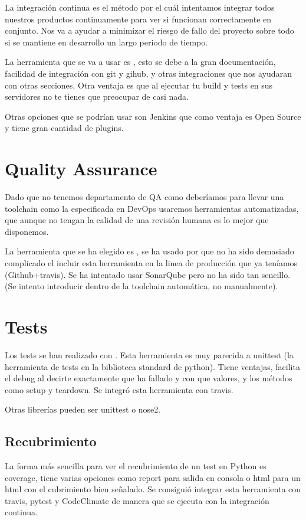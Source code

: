 La integración continua es el método por el cuál intentamos integrar todos nuestros productos continuamente para ver si funcionan correctamente en conjunto. Nos va a ayudar a minimizar el riesgo de fallo del proyecto sobre todo si se mantiene en desarrollo un largo periodo de tiempo.

La herramienta que se va a usar es , esto se debe a la gran documentación, facilidad de integración con git y gihub, y otras integraciones que nos ayudaran con otras secciones. Otra ventaja es que al ejecutar tu build y tests en sus servidores no te tienes que preocupar de casi nada.

Otras opciones que se podrían usar son Jenkins que como ventaja es Open Source y tiene gran cantidad de plugins.


\section{Quality Assurance}

Dado que no tenemos departamento de QA como deberíamos para llevar una toolchain como la especificada en DevOps usaremos herramientas automatizadas, que aunque no tengan la calidad de una revisión humana es lo mejor que disponemos. 

La herramienta que se ha elegido es , se ha usado por que no ha sido demasiado complicado el incluir esta herramienta en la linea de producción que ya teníamos (Github+travis). Se ha intentado usar SonarQube pero no ha sido tan sencillo. (Se intento introducir dentro de la toolchain automática, no manualmente). 


\section{Tests}

Los tests se han realizado con . Esta herramienta es muy parecida a unittest (la herramienta de tests en la biblioteca standard de python). Tiene ventajas, facilita el debug al decirte exactamente que ha fallado y con que valores, y los métodos como setup y teardown. Se integró esta herramienta con travis.

Otras librerías pueden ser unittest o nose2.


\subsection{Recubrimiento}

La forma más sencilla para ver el recubrimiento de un test en Python es coverage, tiene varias opciones como report para salida en consola o html para un html con el cubrimiento bien señalado. Se consiguió integrar esta herramienta con travis, pytest y CodeClimate de manera que se ejecuta con la integración continua.


